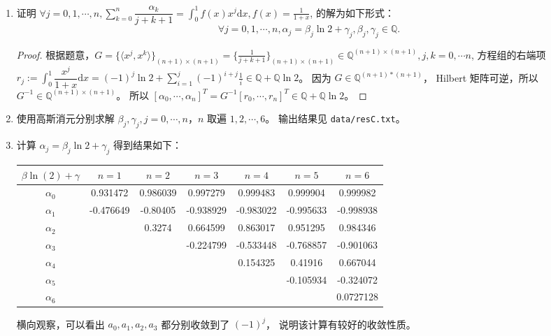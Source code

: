 \documentclass[lang=cn,a4paper,newtx,bibend=bibtex]{elegantpaper}
\newcommand{\dd}{\mathrm{d}}
\newcommand{\Int}[4]{\int_{#1}^{#2}{#3}{\dd {#4}}}
\newcommand{\indot}[2]{\langle {#1}, {#2} \rangle}
\begin{document}
\begin{enumerate}
\item 证明 
$\forall j = 0, 1, \cdots, n, \sum_{k = 0}^{n} \dfrac{\alpha_k}{j + k + 1} = \int_0^1 f(x)x^j \dd x, f(x) = \frac{1}{1 + x}$,
的解为如下形式：
\[\forall j = 0, 1, \cdots, n, \alpha_j = \beta_j \ln 2 + \gamma_j, \beta_j, \gamma_j \in \mathbb{Q}.\]

\begin{proof}
  根据题意，$G = \{\indot{x^j}{x^k}\}_{(n + 1)\times (n + 1)} = \{\frac{1}{j+k+1}\}_{(n+1)\times(n+1)}\in \mathbb{Q}^{(n+1)\times(n+1)}, j,k = 0, \cdots n$,
  方程组的右端项 $r_j := \Int{0}{1}{\dfrac{x^j}{1+x}}{x} = (-1)^j\ln 2 + \sum\limits_{i=1}^{j} (-1)^{i+j} \frac1i \in \mathbb{Q} + \mathbb{Q}\ln2$。
  因为 $G\in \mathbb{Q}^{(n+1)*(n+1)}$，
  Hilbert 矩阵可逆，所以 $G^{-1} \in \mathbb{Q}^{(n+1)\times(n+1)}$。
  所以 $[\alpha_0, \cdots, \alpha_n]^T = G^{-1} [r_0, \cdots, r_n]^T \in \mathbb{Q} + \mathbb{Q}\ln2$。
\end{proof}

\item 使用高斯消元分别求解 $\beta_j, \gamma_j, j = 0, \cdots, n$，$n$ 取遍 $1, 2, \cdots, 6$。
      输出结果见 \lstinline{data/resC.txt}。

\item 计算 $\alpha_j = \beta_j \ln 2 + \gamma_j$ 得到结果如下：

\begin{table}[h]
  \centering
  \begin{tabular}{|c|c|c|c|c|c|c|}
  \hline
  $\beta \ln(2) + \gamma$ & $n = 1$ & $n = 2$ & $n = 3$ & $n = 4$ & $n = 5$ & $n = 6$ \\
  \hline
  $\alpha_0$ & 0.931472 & 0.986039 & 0.997279 & 0.999483 & 0.999904 & 0.999982 \\
  $\alpha_1$ & -0.476649 & -0.80405 & -0.938929 & -0.983022 & -0.995633 & -0.998938 \\
  $\alpha_2$ && 0.3274 & 0.664599 & 0.863017 & 0.951295 & 0.984346 \\
  $\alpha_3$ &&& -0.224799 & -0.533448 & -0.768857 & -0.901063 \\
  $\alpha_4$ &&&& 0.154325 & 0.41916 & 0.667044 \\
  $\alpha_5$ &&&&& -0.105934 & -0.324072 \\
  $\alpha_6$ &&&&&& 0.0727128 \\
  \hline
  \end{tabular}
  \end{table}

  横向观察，可以看出 $a_0, a_1, a_2, a_3$ 都分别收敛到了 $(-1)^j$，
  说明该计算有较好的收敛性质。


\end{enumerate}
\end{document}
